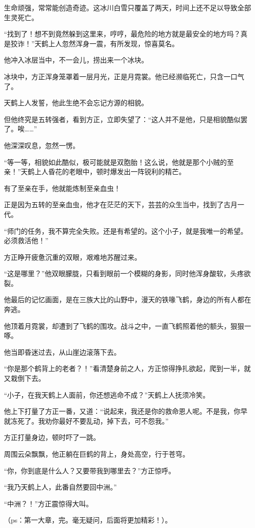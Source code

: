 \begin{this_body}
生命顽强，常常能创造奇迹。这冰川白雪只覆盖了两天，时间上还不足以导致全部生灵死亡。

“找到了！想不到竟然躲到这里来，哼哼，最危险的地方就是最安全的地方吗？真是狡诈！”天鹤上人忽然浑身一震，有所发现，惊喜莫名。

他冲入冰层当中，不一会儿，捞出来一个冰块。

冰块中，方正浑身笼罩着一层月光，正是月霓裳。他已经濒临死亡，只含一口气了。

天鹤上人发誓，他此生绝不会忘记方源的相貌。

但他终究是五转强者，看到方正，立即失望了：“这人并不是他，只是相貌酷似罢了。唉……”

他深深叹息，忽然一愣。

“等一等，相貌如此酷似，极可能就是双胞胎！这么说，他就是那个小贼的至亲！”天鹤上人昏花的老眼中，顿时爆发出一阵锐利的精芒。

有了至亲在手，他就能炼制至亲血虫！

正是因为五转的至亲血虫，他才在茫茫的天下，芸芸的众生当中，找到了古月一代。

“师门的任务，我不算完全失败。还是有希望的。这个小子，就是我唯一的希望。必须救活他！”

方正睁开疲惫沉重的双眼，艰难地苏醒过来。

“这是哪里？”他双眼朦胧，只看到眼前一个模糊的身影，同时他浑身酸软，头疼欲裂。

他最后的记忆画面，是在三族大比的山野中，漫天的铁喙飞鹤，身边的所有人都在奔逃。

他顶着月霓裳，却遭到了飞鹤的围攻。战斗之中，一直飞鹤照着他的额头，狠狠一啄。

他当即昏迷过去，从山崖边滚落下去。

“你是那个鹤背上的老者？！”看清楚身前之人，方正惊得挣扎欲起，爬到一半，就又栽倒下去。

“小子，在我天鹤上人面前，你还想逃命不成？”天鹤上人抚须冷笑。

他上下打量了方正一番，又道：“说起来，我还是你的救命恩人呢。不是我，你早就冻死了。我劝你最好不要乱动，掉下去，可不怨我。”

方正打量身边，顿时吓了一跳。

周围云朵飘飘，他正躺在巨鹤的背上，身处高空，行于苍穹。

“你，你到底是什么人？又要带我到哪里去？”方正惊呼。

“我乃天鹤上人，此番自然要回中洲。”

“中洲？！”方正震惊得大叫。

（ps：第一大章，完。毫无疑问，后面将更加精彩！）。

\end{this_body}

